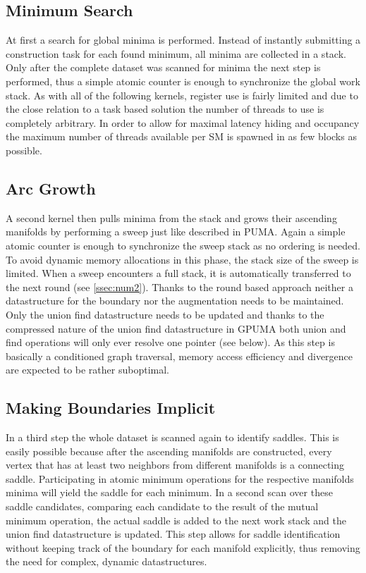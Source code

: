 \documentclass[%
	paper=A4,					%
	twoside=true,				%
	openright,					%
	parskip=full,				%
	chapterprefix=true,			%
	11pt,						%
	headings=normal,			%
	bibliography=totoc,			%
	listof=totoc,				%
	titlepage=on,				%
	captions=tableabove,		%
	draft=false,				%
]{scrreprt}%
\begin{document}
\subsection{Minimum Search}
At first a search for global minima is performed. Instead of instantly submitting a construction task for each found minimum, all minima are collected in a stack. Only after the complete dataset was scanned for minima the next step is performed, thus a simple atomic counter is enough to synchronize the global work stack. As with all of the following kernels, register use is fairly limited and due to the close relation to a task based solution the number of threads to use is completely arbitrary. In order to allow for maximal latency hiding and occupancy the maximum number of threads available per SM is spawned in as few blocks as possible.

\subsection{Arc Growth}
A second kernel then pulls minima from the stack and grows their ascending manifolds by performing a sweep just like described in PUMA. Again a simple atomic counter is enough to synchronize the sweep stack as no ordering is needed. To avoid dynamic memory allocations in this phase, the stack size of the sweep is limited. When a sweep encounters a full stack, it is automatically transferred to the next round (see \ref{ssec:num2}). Thanks to the round based approach neither a datastructure for the boundary nor the augmentation needs to be maintained. Only the union find datastructure needs to be updated and thanks to the compressed nature of the union find datastructure in GPUMA both union and find operations will only ever resolve one pointer (see below). As this step is basically a conditioned graph traversal, memory access efficiency and divergence are expected to be rather suboptimal. 

\subsection{Making Boundaries Implicit}
In a third step the whole dataset is scanned again to identify saddles. This is easily possible because after the ascending manifolds are constructed, every vertex that has at least two neighbors from different manifolds is a connecting saddle. Participating in atomic minimum operations for the respective manifolds minima will yield the saddle for each minimum. In a second scan over these saddle candidates, comparing each candidate to the result of the mutual minimum operation, the actual saddle is added to the next work stack and the union find datastructure is updated. This step allows for saddle identification without keeping track of the boundary for each manifold explicitly, thus removing the need for complex, dynamic datastructures.
\end{document}

